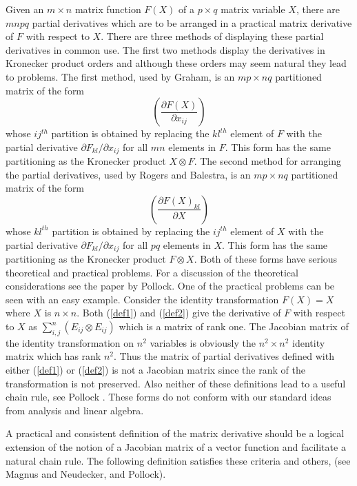 \documentclass[12pt,thmsa,suthesis,verbatim]{report}
\begin{document}
Given an $m\times n$ matrix function $F\left( X\right) $ of a $p\times q$
matrix variable $X$, there are $mnpq$ partial derivatives which are to be
arranged in a practical matrix derivative of $F$ with respect to $X$. There
are three methods of displaying these partial derivatives in common use. The
first two methods display the derivatives in Kronecker product orders and
although these orders may seem natural they lead to problems. The first
method, used by Graham\cite{Graham81}, is an $mp\times nq$ partitioned
matrix of the form 
\begin{equation}
\left( \frac{\partial F\left( X\right) }{\partial x_{ij}}\right)
\label{def1}
\end{equation}
whose $ij^{th}$ partition is obtained by replacing the $kl^{th}$ element of $%
F$ with the partial derivative $\partial F_{kl}/\partial x_{ij}$ for all $mn$
elements in $F$. This form has the same partitioning as the Kronecker
product $X\otimes F$. The second method for arranging the partial
derivatives, used by Rogers\cite{Rogers80} and Balestra\cite{Balestra75}, is
an $mp\times nq$ partitioned matrix of the form 
\begin{equation}
\left( \frac{\partial F\left( X\right) _{kl}}{\partial X}\right)
\label{def2}
\end{equation}
whose $kl^{th}$ partition is obtained by replacing the $ij^{th}$ element of $%
X$ with the partial derivative $\partial F_{kl}/\partial x_{ij}$ for all $pq$
elements in $X$. This form has the same partitioning as the Kronecker
product $F\otimes X$. Both of these forms have serious theoretical and
practical problems. For a discussion of the theoretical considerations see
the paper by Pollock\cite{Pollock85}. One of the practical problems can be
seen with an easy example. Consider the identity transformation $F\left(
X\right) =X$ where $X$ is $n\times n$. Both (\ref{def1}) and (\ref{def2})
give the derivative of $F$ with respect to $X$ as $\sum_{i,j}^n\left(
E_{ij}\otimes E_{ij}\right) $ which is a matrix of rank one. The Jacobian
matrix of the identity transformation on $n^2$ variables is obviously the $%
n^2\times n^2$ identity matrix which has rank $n^2$. Thus the matrix of
partial derivatives defined with either (\ref{def1}) or (\ref{def2}) is not
a Jacobian matrix since the rank of the transformation is not preserved.
Also neither of these definitions lead to a useful chain rule, see Pollock%
\cite{Pollock85}. These forms do not conform with our standard ideas from
analysis and linear algebra.

A practical and consistent definition of the matrix derivative should be a
logical extension of the notion of a Jacobian matrix of a vector function
and facilitate a natural chain rule. The following definition satisfies
these criteria and others, (see Magnus and Neudecker\cite{MagNeud88}, and
Pollock\cite{Pollock85}).
\end{document}
